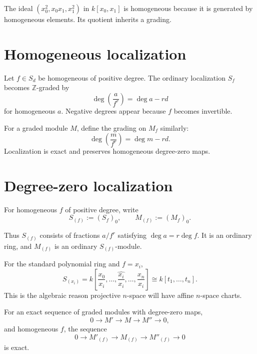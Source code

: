

\begin{example}\label{ex:vi34-expand-02}
The ideal $(x_0^2,x_0x_1,x_1^2)$ in $k[x_0,x_1]$ is homogeneous because it is generated by homogeneous elements.  Its quotient inherits a grading.
\end{example}
\section{Homogeneous localization}
Let \(f\in S_d\) be homogeneous of positive degree. The ordinary localization \(S_f\) becomes \(\mathbb Z\)-graded by
\[
\deg\!\left(\frac{a}{f^r}\right)=\deg a-rd
\]
for homogeneous \(a\). Negative degrees appear because \(f\) becomes invertible.

For a graded module \(M\), define the grading on \(M_f\) similarly:
\[
\deg\!\left(\frac{m}{f^r}\right)=\deg m-rd.
\]
Localization is exact and preserves homogeneous degree-zero maps.

\section{Degree-zero localization}
\begin{definition}
For homogeneous \(f\) of positive degree, write
\[
S_{(f)}:=(S_f)_0,\qquad M_{(f)}:=(M_f)_0.
\]
\end{definition}

Thus \(S_{(f)}\) consists of fractions \(a/f^r\) satisfying \(\deg a=r\deg f\). It is an ordinary ring, and \(M_{(f)}\) is an ordinary \(S_{(f)}\)-module.

For the standard polynomial ring and \(f=x_i\),
\[
S_{(x_i)}
=k\!\left[\frac{x_0}{x_i},\ldots,\widehat{\frac{x_i}{x_i}},\ldots,\frac{x_n}{x_i}\right]
\cong k[t_1,\ldots,t_n].
\]
This is the algebraic reason projective \(n\)-space will have affine \(n\)-space charts.



\begin{proposition}
For an exact sequence of graded modules with degree-zero maps,
\[
0\to M'\to M\to M''\to0,
\]
and homogeneous \(f\), the sequence
\[
0\to M'_{(f)}\to M_{(f)}\to M''_{(f)}\to0
\]
is exact.
\end{proposition}

